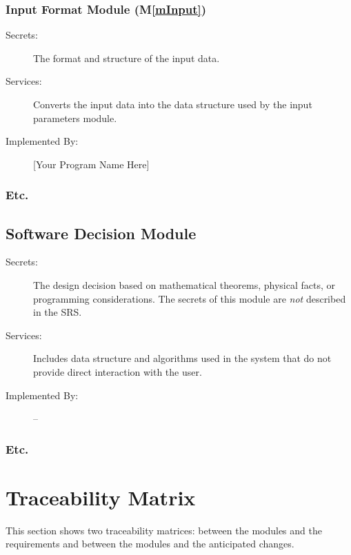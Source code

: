 \documentclass[12pt, titlepage]{article}
\newcommand{\mref}[1]{M\ref{#1}}
\begin{document}
\subsubsection{Input Format Module (\mref{mInput})}

\begin{description}
\item[Secrets:]The format and structure of the input data.
\item[Services:]Converts the input data into the data structure used by the
  input parameters module.
\item[Implemented By:] [Your Program Name Here]
\end{description}

\subsubsection{Etc.}


\subsection{Software Decision Module}

\begin{description}
\item[Secrets:] The design decision based on mathematical theorems, physical
  facts, or programming considerations. The secrets of this module are
  \emph{not} described in the SRS.
\item[Services:] Includes data structure and algorithms used in the system that
  do not provide direct interaction with the user. 
\item[Implemented By:] --
\end{description}

\subsubsection{Etc.}

\section{Traceability Matrix} \label{SecTM}

This section shows two traceability matrices: between the modules and the
requirements and between the modules and the anticipated changes.
\end{document}
